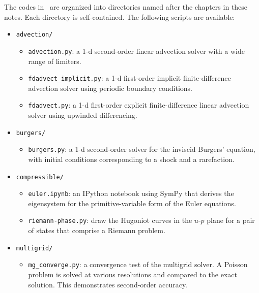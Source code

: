The codes in \hydroex\ are organized into directories named after the
chapters in these notes.  Each directory is self-contained.  The
following scripts are available:

\begin{itemize}

\item {\tt advection/}
  
  \begin{itemize}
  \item {\tt advection.py}: a 1-d second-order linear advection solver
    with a wide range of limiters.

  \item {\tt fdadvect\_implicit.py}: a 1-d first-order implicit
    finite-difference advection solver using periodic boundary
    conditions.

  \item {\tt fdadvect.py}: a 1-d first-order explicit
    finite-difference linear advection solver using upwinded
    differencing.

  \end{itemize}

\item {\tt burgers/}

  \begin{itemize}
  \item {\tt burgers.py}: a 1-d second-order solver for the inviscid
    Burgers' equation, with initial conditions corresponding to a
    shock and a rarefaction.

  \end{itemize}

\item {\tt compressible/}

  \begin{itemize}
  \item {\tt euler.ipynb}: an {\sf IPython} notebook using {\sf SymPy}
      that derives the eigensystem for the primitive-variable form
      of the Euler equations.
      
  \item {\tt riemann-phase.py}: draw the Hugoniot curves in the $u$-$p$ plane
     for a pair of states that comprise a Riemann problem.
  \end{itemize}

\item {\tt multigrid/}

  \begin{itemize}
  \item {\tt mg\_converge.py}: a convergence test of the multigrid
    solver.  A Poisson problem is solved at various resolutions and
    compared to the exact solution.  This demonstrates second-order
    accuracy.


\end{itemize}
\end{itemize}
